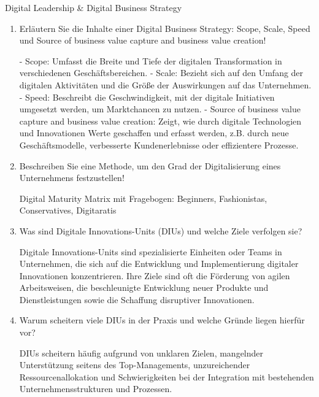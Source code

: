 \documentclass{article}
\begin{document}
\begin{exercise}{Digital Leadership \& Digital Business Strategy}
\begin{enumerate}
    \item Erläutern Sie die Inhalte einer Digital Business Strategy: Scope, Scale, Speed und Source of business value capture and business value creation!
          \begin{solution}
            - Scope: Umfasst die Breite und Tiefe der digitalen Transformation in verschiedenen Geschäftsbereichen.
            - Scale: Bezieht sich auf den Umfang der digitalen Aktivitäten und die Größe der Auswirkungen auf das Unternehmen.
            - Speed: Beschreibt die Geschwindigkeit, mit der digitale Initiativen umgesetzt werden, um Marktchancen zu nutzen.
            - Source of business value capture and business value creation: Zeigt, wie durch digitale Technologien und Innovationen Werte geschaffen und erfasst werden, z.B. durch neue Geschäftsmodelle, verbesserte Kundenerlebnisse oder effizientere Prozesse.
          \end{solution}

    \item Beschreiben Sie eine Methode, um den Grad der Digitalisierung eines Unternehmens festzustellen!
          \begin{solution}
            Digital Maturity Matrix mit Fragebogen: Beginners, Fashionistas, Conservatives, Digitaratis
          \end{solution}

    \item Was sind Digitale Innovations-Units (DIUs) und welche Ziele verfolgen sie?
          \begin{solution}
            Digitale Innovations-Units sind spezialisierte Einheiten oder Teams in Unternehmen, die sich auf die Entwicklung und Implementierung digitaler Innovationen konzentrieren. Ihre Ziele sind oft die Förderung von agilen Arbeitsweisen, die beschleunigte Entwicklung neuer Produkte und Dienstleistungen sowie die Schaffung disruptiver Innovationen.
          \end{solution}

    \item Warum scheitern viele DIUs in der Praxis und welche Gründe liegen hierfür vor?
          \begin{solution}
            DIUs scheitern häufig aufgrund von unklaren Zielen, mangelnder Unterstützung seitens des Top-Managements, unzureichender Ressourcenallokation und Schwierigkeiten bei der Integration mit bestehenden Unternehmensstrukturen und Prozessen.
          \end{solution}


\end{enumerate}
\end{exercise}
\end{document}
